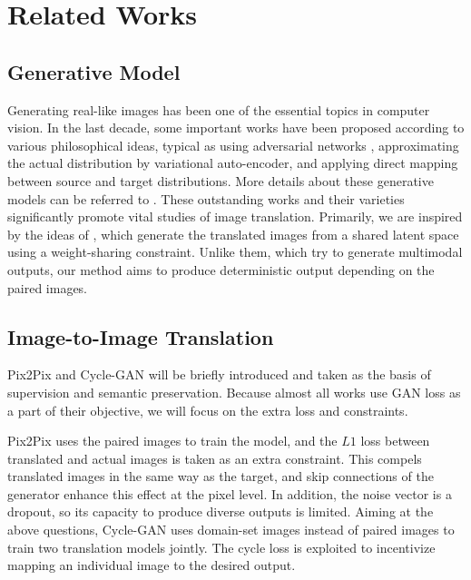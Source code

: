 \section{Related Works}
\label{sec2}
\subsection{Generative Model}\label{sec2.1}
Generating real-like images has been one of the essential topics in computer vision. In the last decade, some important works have been proposed according to various philosophical ideas, typical as using adversarial networks \cite{Goodfellow:NIPS2014}, approximating the actual distribution by variational auto-encoder\cite{Kingma:ICLR2014}, and applying direct mapping between source and target distributions\cite{Rezende:ICML2015}. More details about these generative models can be referred to \cite{Xia:TPAMI2023,DBLP:Tschannen2018,Ivan:NF}. These outstanding works and their varieties significantly promote vital studies of image translation. Primarily, we are inspired by the ideas of \cite{Liu:NIPS2017,Liu:NIPS2016,Yusuf:CMSNET}, which generate the translated images from a shared latent space using a weight-sharing constraint. Unlike them, which try to generate multimodal outputs, our method aims to produce deterministic output depending on the paired images.

\subsection{Image-to-Image Translation}\label{sec2.2}
Pix2Pix\cite{Isola:CVPR2017} and Cycle-GAN\cite{Zhu:ICCV2017} will be briefly introduced and taken as the basis of supervision and semantic preservation. Because almost all works use GAN loss as a part of their objective, we will focus on the extra loss and constraints.

Pix2Pix uses the paired images to train the model, and the $L1$ loss between translated and actual images is taken as an extra constraint. This compels translated images in the same way as the target, and skip connections of the generator enhance this effect at the pixel level. In addition, the noise vector is a dropout, so its capacity to produce diverse outputs is limited. Aiming at the above questions, Cycle-GAN uses domain-set images instead of paired images to train two translation models jointly. The cycle loss is exploited to incentivize mapping an individual image to the desired output.

